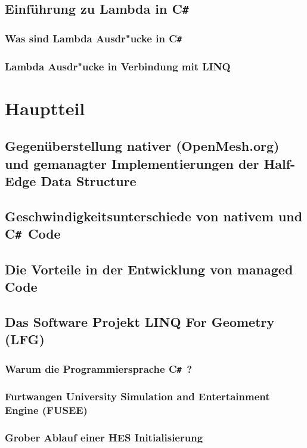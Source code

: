 \documentclass[12pt,a4paper]{scrreprt}
\newcommand{\CS}{C\texttt{\#}}
\newcommand{\CSS}{C\texttt{\# }}
\begin{document}
	\section {Einführung zu Lambda in \CS}
		\subsection {Was sind Lambda Ausdr"ucke in \CS}
		\subsection {Lambda Ausdr"ucke in Verbindung mit LINQ}




\chapter {Hauptteil}
	\section {Gegenüberstellung nativer (OpenMesh.org) und gemanagter Implementierungen der Half-Edge Data Structure}
	\section {Geschwindigkeitsunterschiede von nativem und \CSS Code}
	\section {Die Vorteile in der Entwicklung von managed Code}
	\section {Das Software Projekt LINQ For Geometry (LFG)}
		\subsection {Warum die Programmiersprache \CSS ?}
		\subsection {Furtwangen University Simulation and Entertainment Engine (FUSEE)}
		\subsection {Grober Ablauf einer HES Initialisierung}
\end{document}
